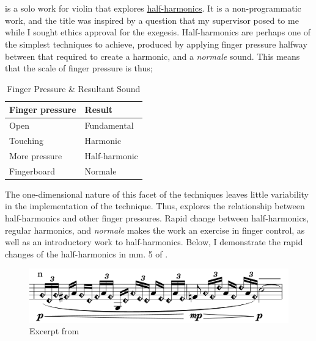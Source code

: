 \section{\violinPiece} \label{sec:violinPiece}
\hyperref[violinPiece]{\violinPiece} is a solo work for violin that explores \hyperref[sec:halfHarmonicsDiscussion]{half-harmonics}.
It is a non-programmatic work, and the title was inspired by a question that my supervisor posed to me while I sought ethics approval for the exegesis.
Half-harmonics are perhaps one of the simplest techniques to achieve, produced by applying finger pressure halfway between that required to create a harmonic, and a \emph{normale} sound.
This means that the scale of finger pressure is thus;

\begin{table}[]
    \centering
    \caption{Finger Pressure \& Resultant Sound}
    \label{tab:finger-pressure}
    \begin{tabular}{@{}ll@{}}
    \toprule
    Finger pressure & Result        \\ \midrule
    Open            & Fundamental   \\
    Touching        & Harmonic      \\
    More pressure   & Half-harmonic \\
    Fingerboard     & Normale       \\ \bottomrule
    \end{tabular}%
    \end{table}

The one-dimensional nature of this facet of the techniques leaves little variability in the implementation of the technique. 
Thus, \violinPiece \space explores the relationship between half-harmonics and other finger pressures. 
Rapid change between half-harmonics, regular harmonics, and \emph{normale} makes the work an exercise in finger control, as well as an introductory work to half-harmonics.
Below, I demonstrate the rapid changes of the half-harmonics in mm. 5 of \violinPiece.

\begin{figure}
    \includegraphics[width=\linewidth]{./resources/violinHalfHarmonicsExcerpt5.pdf}
    \caption{Excerpt from \violinPiece}
  \label{fig:Excerpt from what are you doing with the humans, mm. 5}
  \end{figure}

